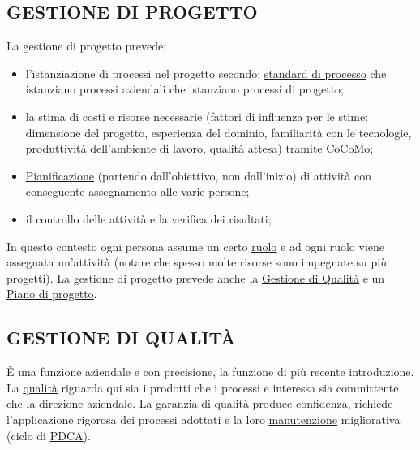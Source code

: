 		\subsection{GESTIONE DI PROGETTO}  \label{gestioneprogetto}	%
		La gestione di progetto prevede:
			\begin{itemize}
				\item l'istanziazione di processi nel progetto secondo: \underline{\hyperref[standard]{standard di processo}} che istanziano processi aziendali che istanziano processi di progetto;
				\item la stima di costi e risorse necessarie (fattori di influenza per le stime: dimensione del progetto, esperienza del dominio, familiarità con le tecnologie, produttività dell'ambiente di lavoro, \underline{\hyperref[qualita]{qualità}} attesa) tramite \underline{\hyperref[cocomo]{CoCoMo}};
				\item \underline{\hyperref[pianificazione]{Pianificazione}} (partendo dall'obiettivo, non dall'inizio) di attività con conseguente assegnamento alle varie persone; 
				\item il controllo delle attività e la verifica dei risultati;
			\end{itemize}
		In questo contesto ogni persona assume un certo \underline{\hyperref[ruoli]{ruolo}} e ad ogni ruolo viene assegnata un'attività (notare che spesso molte risorse sono impegnate su più progetti). La gestione di progetto prevede anche la  \underline{\hyperref[gestionequalita]{Gestione di Qualità}} e un \underline{\hyperref[piano]{Piano di progetto}}.
		
		\subsection{GESTIONE DI QUALITÀ}   \label{gestionequalita}
		È una funzione aziendale e con precisione, la funzione di più recente introduzione. La \underline{\hyperref[qualita]{qualità}} riguarda qui sia i prodotti che i processi e interessa sia committente che la direzione aziendale. La garanzia di qualità produce confidenza, richiede l'applicazione rigorosa dei processi adottati e la loro \underline{\hyperref[manutenzione]{manutenzione}} migliorativa (ciclo di \underline{\hyperref[pdca]{PDCA}}).
	
	
